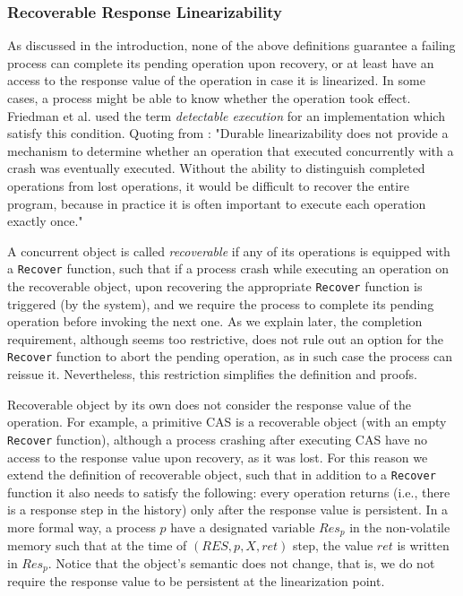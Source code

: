 \subsubsection{Recoverable Response Linearizability}
As discussed in the introduction, none of the above definitions guarantee a failing process can complete its pending operation upon recovery, or at least have an access to the response value of the operation in case it is linearized. In some cases, a process might be able to know whether the operation took effect. Friedman et al. \cite{DBLP:conf/wdag/FriedmanHMP17} used the term \textit{detectable execution} for an implementation which satisfy this condition. Quoting from \cite{DBLP:conf/wdag/FriedmanHMP17}: "Durable linearizability does not provide a mechanism to determine whether an operation that executed concurrently with a crash was eventually executed. Without the ability to distinguish completed operations from lost operations, it would be difficult to recover the entire program, because in practice it is often important to execute each operation exactly once."

A concurrent object is called \textit{recoverable} if any of its operations is equipped with a \texttt{Recover} function, such that if a process crash while executing an operation on the recoverable object, upon recovering the appropriate \texttt{Recover} function is triggered (by the system), and we require the process to complete its pending operation before invoking the next one. As we explain later, the completion requirement, although seems too restrictive, does not rule out an option for the \texttt{Recover} function to abort the pending operation, as in such case the process can reissue it. Nevertheless, this restriction simplifies the definition and proofs.

Recoverable object by its own does not consider the response value of the operation. For example, a primitive CAS is a recoverable object (with an empty \texttt{Recover} function), although a process crashing after executing CAS have no access to the response value upon recovery, as it was lost. For this reason we extend the definition of recoverable object, such that in addition to a \texttt{Recover} function it also needs to satisfy the following: every operation returns (i.e., there is a response step in the history) only after the response value is persistent. In a more formal way, a process $p$ have a designated variable $Res_p$ in the non-volatile memory such that at the time of $(RES,p,X,ret)$ step, the value $ret$ is written in $Res_p$.
Notice that the object's semantic does not change, that is, we do not require the response value to be persistent at the linearization point.

